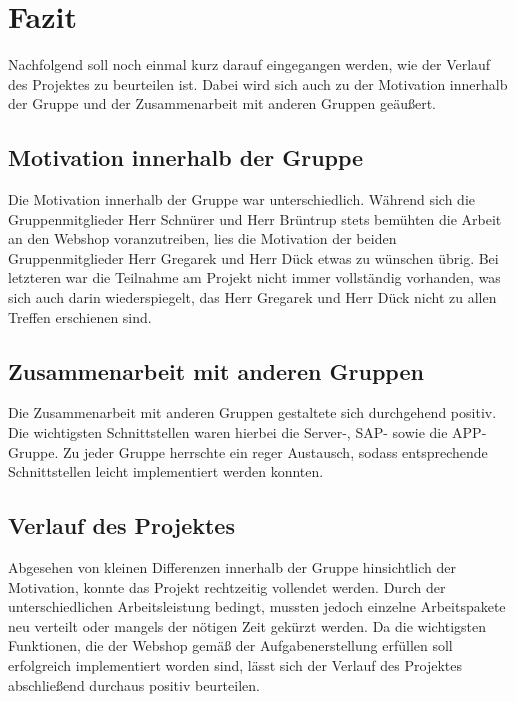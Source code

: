 
\section{Fazit}

Nachfolgend soll noch einmal kurz darauf eingegangen werden, wie der Verlauf des Projektes zu beurteilen ist. Dabei wird sich auch zu der Motivation innerhalb der Gruppe und der Zusammenarbeit mit anderen Gruppen geäußert.


\subsection{Motivation innerhalb der Gruppe}

Die Motivation innerhalb der Gruppe war unterschiedlich. Während sich die Gruppenmitglieder Herr Schnürer und Herr Brüntrup stets bemühten die Arbeit an den Webshop voranzutreiben, lies die Motivation der beiden Gruppenmitglieder Herr Gregarek und Herr Dück etwas zu wünschen übrig.  Bei letzteren war die Teilnahme am Projekt nicht immer vollständig vorhanden, was sich auch darin wiederspiegelt, das Herr Gregarek und Herr Dück nicht zu allen Treffen erschienen sind.

\subsection{Zusammenarbeit mit anderen Gruppen}
Die Zusammenarbeit mit anderen Gruppen gestaltete sich durchgehend positiv. Die wichtigsten Schnittstellen waren hierbei die Server-, SAP- sowie die APP-Gruppe. Zu jeder Gruppe herrschte ein reger Austausch, sodass entsprechende Schnittstellen leicht implementiert werden konnten.


\subsection{Verlauf des Projektes}

Abgesehen von kleinen Differenzen innerhalb der Gruppe hinsichtlich der Motivation, konnte das Projekt rechtzeitig vollendet werden. Durch der unterschiedlichen Arbeitsleistung bedingt, mussten jedoch einzelne Arbeitspakete neu verteilt oder mangels der nötigen Zeit gekürzt werden. Da die wichtigsten Funktionen, die der Webshop gemäß der Aufgabenerstellung erfüllen soll erfolgreich implementiert worden sind, lässt sich der Verlauf des Projektes abschließend durchaus positiv beurteilen.